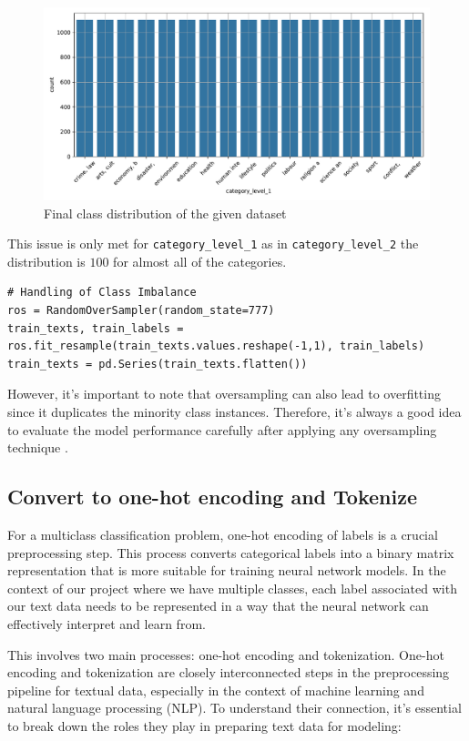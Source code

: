 \begin{figure}[htpb]
	\centering
	\includegraphics[width=\linewidth]{Images/final_class_distribution.pdf}
	\caption{Final class distribution of the given dataset}
	\label{fig:final_class_distribution}
\end{figure}

This issue is only met for \verb|category_level_1| as in \verb|category_level_2| the distribution is $100$ for almost all of the categories.\\

\begin{lstlisting}
# Handling of Class Imbalance
ros = RandomOverSampler(random_state=777)
train_texts, train_labels = ros.fit_resample(train_texts.values.reshape(-1,1), train_labels)
train_texts = pd.Series(train_texts.flatten())
\end{lstlisting}

However, it's important to note that oversampling can also lead to overfitting since it duplicates the minority class instances. Therefore, it's always a good idea to evaluate the model performance carefully after applying any oversampling technique \cite{test1}.

\subsection{Convert to one-hot encoding and Tokenize}
For a multiclass classification problem, one-hot encoding of labels is a crucial preprocessing step. This process converts categorical labels into a binary matrix representation that is more suitable for training neural network models.
In the context of our project where we have multiple classes, each label associated with our text data needs to be represented in a way that the neural network can effectively interpret and learn from.

This involves two main processes: one-hot encoding and tokenization. One-hot encoding and tokenization are closely interconnected steps in the preprocessing pipeline for textual data, especially in the context of machine learning and natural language processing (NLP). To understand their connection, it's essential to break down the roles they play in preparing text data for modeling: \\

